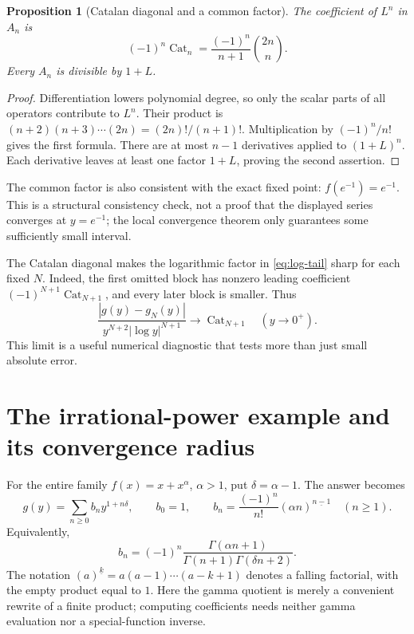 \documentclass[11pt,a4paper]{article}
\numberwithin{equation}{section}
\newtheorem{proposition}[theorem]{Proposition}
\theoremstyle{definition}
\newcommand{\fall}[2]{\left(#1\right)^{\underline{#2}}}
\begin{document}
\begin{proposition}[Catalan diagonal and a common factor]
\label{prop:catalan}
The coefficient of $L^n$ in $A_n$ is
\[
 (-1)^n\operatorname{Cat}_n
 =\frac{(-1)^n}{n+1}\binom{2n}{n}.
\]
Every $A_n$ is divisible by $1+L$.
\end{proposition}
\begin{proof}
Differentiation lowers polynomial degree, so only the scalar parts of
all operators contribute to $L^n$. Their product is
$(n+2)(n+3)\cdots(2n)=(2n)!/(n+1)!$. Multiplication by $(-1)^n/n!$
gives the first formula. There are at most $n-1$ derivatives applied to
$(1+L)^n$. Each derivative leaves at least one factor $1+L$, proving
 the second assertion.
\end{proof}

The common factor is also consistent with the exact fixed point:
$f(e^{-1})=e^{-1}$. This is a structural consistency check, not a proof
that the displayed series converges at $y=e^{-1}$; the local convergence
theorem only guarantees some sufficiently small interval.

The Catalan diagonal makes the logarithmic factor in \eqref{eq:log-tail}
sharp for each fixed $N$. Indeed, the first omitted block has nonzero
leading coefficient $(-1)^{N+1}\operatorname{Cat}_{N+1}$, and every later
block is smaller. Thus
\[
 \frac{|g(y)-g_N(y)|}
 {y^{N+2}|\log y|^{N+1}}\longrightarrow\operatorname{Cat}_{N+1}
 \quad(y\to0^+).
\]
This limit is a useful numerical diagnostic that tests more than just
small absolute error.

\section{The irrational-power example and its convergence radius}
\label{sec:irrational-example}

For the entire family $f(x)=x+x^\alpha$, $\alpha>1$, put
$\delta=\alpha-1$. The answer becomes
\begin{equation}\label{eq:alpha-all}
 g(y)=\sum_{n\ge0}b_n y^{1+n\delta},\qquad b_0=1,
 \qquad
 b_n=\frac{(-1)^n}{n!}\fall{\alpha n}{n-1}\quad(n\ge1).
\end{equation}
Equivalently,
\begin{equation}\label{eq:alpha-gamma}
 b_n=(-1)^n
 \frac{\Gamma(\alpha n+1)}{\Gamma(n+1)\Gamma(\delta n+2)}.
\end{equation}
The notation $(a)^{\underline{k}}=a(a-1)\cdots(a-k+1)$ denotes a
falling factorial, with the empty product equal to $1$.
Here the gamma quotient is merely a convenient rewrite of a finite
product; computing coefficients needs neither gamma evaluation nor a
special-function inverse.
\end{document}
